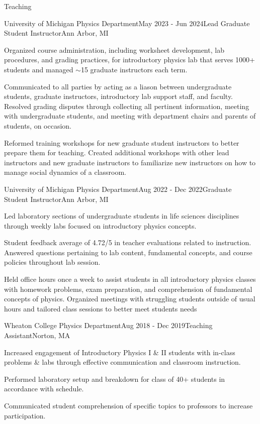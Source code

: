 \documentclass{resume} %
\begin{document}
\begin{rSection}{Teaching}

\begin{rSubsection}{University of Michigan Physics Department}{May 2023 - Jun 2024}{Lead Graduate Student Instructor}{Ann Arbor, MI}
    \item Organized course administration, including worksheet development, lab procedures, and grading practices, for introductory physics lab that serves 1000+ students and managed $\sim$15 graduate instructors each term.
    \item Communicated to all parties by acting as a liason between undergraduate students, graduate instructors, introductory lab support staff, and faculty. Resolved grading disputes through collecting all pertinent information, meeting with undergraduate students, and meeting with department chairs and parents of students, on occasion.
    \item Reformed training workshops for new graduate student instructors to better prepare them for teaching. Created additional workshops with other lead instructors and new graduate instructors to familiarize new instructors on how to manage social dynamics of a classroom.
\end{rSubsection}

\begin{rSubsection}{University of Michigan Physics Department}{Aug 2022 - Dec 2022}{Graduate Student Instructor}{Ann Arbor, MI}
\item Led laboratory sections of undergraduate students in life sciences disciplines through weekly labs focused on introductory physics concepts. 
\item Student feedback average of 4.72/5 in teacher evaluations related to instruction. Answered questions pertaining to lab content, fundamental concepts, and course policies throughout lab session.
\item Held office hours once a week to assist students in all introductory physics classes with homework problems, exam preparation, and comprehension of fundamental concepts of physics. Organized meetings with struggling students outside of usual hours and tailored class sessions to better meet students needs

\end{rSubsection}

\begin{rSubsection}{Wheaton College Physics Department}{Aug 2018 - Dec 2019}{Teaching Assistant}{Norton, MA}
\item Increased engagement of Introductory Physics I \& II students with in-class problems \& labs through effective communication and classroom instruction.
\item Performed laboratory setup and breakdown for class of 40+ students in accordance with schedule.
\item Communicated student comprehension of specific topics to professors to increase participation.


\end{rSubsection}
\end{rSection}
\end{document}
